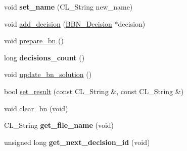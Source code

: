 \begin{DoxyCompactItemize}
\item 
\hypertarget{classBBN__Plot_a9731aa7dde3de5dbb85fde57ead01dcf}{
void {\bfseries set\_\-name} (CL\_\-String new\_\-name)}
\label{classBBN__Plot_a9731aa7dde3de5dbb85fde57ead01dcf}

\item 
void \hyperlink{classBBN__Plot_a7d7efcce2bd7fa7599f2bf6db57b8bdc}{add\_\-decision} (\hyperlink{classBBN__Decision}{BBN\_\-Decision} $\ast$decision)
\item 
void \hyperlink{classBBN__Plot_acc89676366edd3b07bfb9ec6d4bb61b5}{prepare\_\-bn} ()
\item 
\hypertarget{classBBN__Plot_a10c12f29c80dc8c61cf2cdd19cf15fdf}{
long {\bfseries decisions\_\-count} ()}
\label{classBBN__Plot_a10c12f29c80dc8c61cf2cdd19cf15fdf}

\item 
void \hyperlink{classBBN__Plot_a452d2d4a9b15217481ef83b781903627}{update\_\-bn\_\-solution} ()
\item 
bool \hyperlink{classBBN__Plot_ab3f21c1b59ad41eb450f16170e13934c}{set\_\-result} (const CL\_\-String \&, const CL\_\-String \&)
\item 
void \hyperlink{classBBN__Plot_a04269d854d91d36d29f4297915f16e84}{clear\_\-bn} (void)
\item 
\hypertarget{classBBN__Plot_a7c900133c622202df7845cd9c3faa77e}{
CL\_\-String {\bfseries get\_\-file\_\-name} (void)}
\label{classBBN__Plot_a7c900133c622202df7845cd9c3faa77e}

\item 
\hypertarget{classBBN__Plot_aa711d9880c1f8cf8417210686a0e14d9}{
unsigned long {\bfseries get\_\-next\_\-decision\_\-id} (void)}
\label{classBBN__Plot_aa711d9880c1f8cf8417210686a0e14d9}

\end{DoxyCompactItemize}


